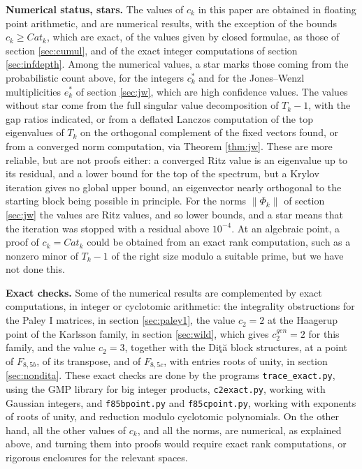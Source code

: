 \documentclass[11pt]{amsart}
\begin{document}
\noindent\textbf{Numerical status, stars.} The values of $c_k$ in this paper are obtained in floating point arithmetic, and are numerical results, with the exception of the bounds $c_k\geq Cat_k$, which are exact, of the values given by closed formulae, as those of section \ref{sec:cumul}, and of the exact integer computations of section \ref{sec:infdepth}. Among the numerical values, a star marks those coming from the probabilistic count above, for the integers $c_k^*$ and for the Jones--Wenzl multiplicities $e_k^*$ of section \ref{sec:jw}, which are high confidence values. The values without star come from the full singular value decomposition of $T_k-1$, with the gap ratios indicated, or from a deflated Lanczos computation of the top eigenvalues of $T_k$ on the orthogonal complement of the fixed vectors found, or from a converged norm computation, via Theorem \ref{thm:jw}. These are more reliable, but are not proofs either: a converged Ritz value is an eigenvalue up to its residual, and a lower bound for the top of the spectrum, but a Krylov iteration gives no global upper bound, an eigenvector nearly orthogonal to the starting block being possible in principle. For the norms $\|\Phi_k\|$ of section \ref{sec:jw} the values are Ritz values, and so lower bounds, and a star means that the iteration was stopped with a residual above $10^{-4}$. At an algebraic point, a proof of $c_k=Cat_k$ could be obtained from an exact rank computation, such as a nonzero minor of $T_k-1$ of the right size modulo a suitable prime, but we have not done this.

\medskip

\noindent\textbf{Exact checks.} Some of the numerical results are complemented by exact computations, in integer or cyclotomic arithmetic: the integrality obstructions for the Paley I matrices, in section \ref{sec:paley1}, the value $c_2=2$ at the Haagerup point of the Karlsson family, in section \ref{sec:wild}, which gives $c_2^{gen}=2$ for this family, and the value $c_2=3$, together with the Di\c t\u a block structures, at a point of $F_{8,5b}$, of its transpose, and of $F_{8,5c}$, with entries roots of unity, in section \ref{sec:nondita}. These exact checks are done by the programs \texttt{trace\_exact.py}, using the GMP library for big integer products, \texttt{c2exact.py}, working with Gaussian integers, and \texttt{f85bpoint.py} and \texttt{f85cpoint.py}, working with exponents of roots of unity, and reduction modulo cyclotomic polynomials. On the other hand, all the other values of $c_k$, and all the norms, are numerical, as explained above, and turning them into proofs would require exact rank computations, or rigorous enclosures for the relevant spaces.
\end{document}
